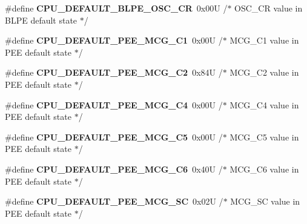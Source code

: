 \begin{DoxyCompactItemize}
\item 
\#define {\bfseries C\+P\+U\+\_\+\+D\+E\+F\+A\+U\+L\+T\+\_\+\+B\+L\+P\+E\+\_\+\+O\+S\+C\+\_\+\+CR}~0x00\+U     /$\ast$ O\+S\+C\+\_\+\+C\+R value in B\+L\+P\+E default state $\ast$/\hypertarget{group___c_p_u___config__module_ga28e19a519db0a033322b83ffea7f346b}{}\label{group___c_p_u___config__module_ga28e19a519db0a033322b83ffea7f346b}

\item 
\#define {\bfseries C\+P\+U\+\_\+\+D\+E\+F\+A\+U\+L\+T\+\_\+\+P\+E\+E\+\_\+\+M\+C\+G\+\_\+\+C1}~0x00\+U     /$\ast$ M\+C\+G\+\_\+\+C1 value in P\+E\+E default state $\ast$/\hypertarget{group___c_p_u___config__module_ga8a7d45bff9260a53b842618bda963fb2}{}\label{group___c_p_u___config__module_ga8a7d45bff9260a53b842618bda963fb2}

\item 
\#define {\bfseries C\+P\+U\+\_\+\+D\+E\+F\+A\+U\+L\+T\+\_\+\+P\+E\+E\+\_\+\+M\+C\+G\+\_\+\+C2}~0x84\+U     /$\ast$ M\+C\+G\+\_\+\+C2 value in P\+E\+E default state $\ast$/\hypertarget{group___c_p_u___config__module_gaaac2a1f703301b8a4f424d96733d5733}{}\label{group___c_p_u___config__module_gaaac2a1f703301b8a4f424d96733d5733}

\item 
\#define {\bfseries C\+P\+U\+\_\+\+D\+E\+F\+A\+U\+L\+T\+\_\+\+P\+E\+E\+\_\+\+M\+C\+G\+\_\+\+C4}~0x00\+U     /$\ast$ M\+C\+G\+\_\+\+C4 value in P\+E\+E default state $\ast$/\hypertarget{group___c_p_u___config__module_ga4d82c2f5e224e1180ee406fc78c84ab6}{}\label{group___c_p_u___config__module_ga4d82c2f5e224e1180ee406fc78c84ab6}

\item 
\#define {\bfseries C\+P\+U\+\_\+\+D\+E\+F\+A\+U\+L\+T\+\_\+\+P\+E\+E\+\_\+\+M\+C\+G\+\_\+\+C5}~0x00\+U     /$\ast$ M\+C\+G\+\_\+\+C5 value in P\+E\+E default state $\ast$/\hypertarget{group___c_p_u___config__module_ga0ce870fc3ca55e1b0fd770575d50e354}{}\label{group___c_p_u___config__module_ga0ce870fc3ca55e1b0fd770575d50e354}

\item 
\#define {\bfseries C\+P\+U\+\_\+\+D\+E\+F\+A\+U\+L\+T\+\_\+\+P\+E\+E\+\_\+\+M\+C\+G\+\_\+\+C6}~0x40\+U     /$\ast$ M\+C\+G\+\_\+\+C6 value in P\+E\+E default state $\ast$/\hypertarget{group___c_p_u___config__module_ga045e3ea3ef0eb2d05eee0d21eff585f8}{}\label{group___c_p_u___config__module_ga045e3ea3ef0eb2d05eee0d21eff585f8}

\item 
\#define {\bfseries C\+P\+U\+\_\+\+D\+E\+F\+A\+U\+L\+T\+\_\+\+P\+E\+E\+\_\+\+M\+C\+G\+\_\+\+SC}~0x02\+U     /$\ast$ M\+C\+G\+\_\+\+S\+C value in P\+E\+E default state $\ast$/\hypertarget{group___c_p_u___config__module_gaa3572d1fcb3d287ae6cd3d637b3c5d52}{}\label{group___c_p_u___config__module_gaa3572d1fcb3d287ae6cd3d637b3c5d52}


\end{DoxyCompactItemize}
